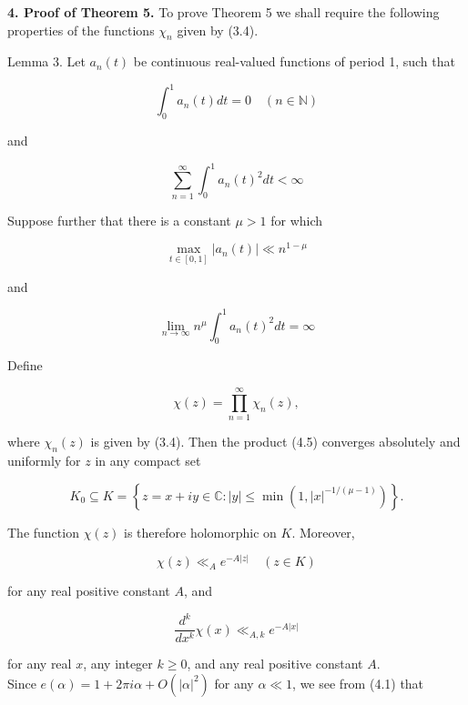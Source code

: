 \documentclass[10pt]{article}
\newcommand{\articleSection}[2]{%
  \par\medskip\noindent\textbf{#1. #2.}\enspace
}
\begin{document}
\articleSection{4}{Proof of Theorem 5}To prove Theorem 5 we shall require the following properties of the functions $\chi_{n}$ given by (3.4).

Lemma 3. Let $a_{n}(t)$ be continuous real-valued functions of period 1, such that


\begin{equation*}
\int_{0}^{1} a_{n}(t) d t=0 \quad(n \in \mathbb{N}) \tag{4.1}
\end{equation*}


and


\begin{equation*}
\sum_{n=1}^{\infty} \int_{0}^{1} a_{n}(t)^{2} d t<\infty \tag{4.2}
\end{equation*}


Suppose further that there is a constant $\mu>1$ for which


\begin{equation*}
\max _{t \in[0,1]}\left|a_{n}(t)\right| \ll n^{1-\mu} \tag{4.3}
\end{equation*}


and


\begin{equation*}
\lim _{n \rightarrow \infty} n^{\mu} \int_{0}^{1} a_{n}(t)^{2} d t=\infty \tag{4.4}
\end{equation*}


Define


\begin{equation*}
\chi(z)=\prod_{n=1}^{\infty} \chi_{n}(z), \tag{4.5}
\end{equation*}


where $\chi_{n}(z)$ is given by (3.4). Then the product (4.5) converges absolutely and uniformly for $z$ in any compact set

$$
K_{0} \subseteq K=\left\{z=x+i y \in \mathbb{C}:|y| \leq \min \left(1,|x|^{-1 /(\mu-1)}\right)\right\} .
$$

The function $\chi(z)$ is therefore holomorphic on $K$. Moreover,


\begin{equation*}
\chi(z) \ll_{A} e^{-A|z|} \quad(z \in K) \tag{4.6}
\end{equation*}


for any real positive constant $A$, and

$$
\frac{d^{k}}{d x^{k}} \chi(x) \ll_{A, k} e^{-A|x|}
$$

for any real $x$, any integer $k \geq 0$, and any real positive constant $A$.\\
Since $e(\alpha)=1+2 \pi i \alpha+O\left(|\alpha|^{2}\right)$ for any $\alpha \ll 1$, we see from (4.1) that
\end{document}

